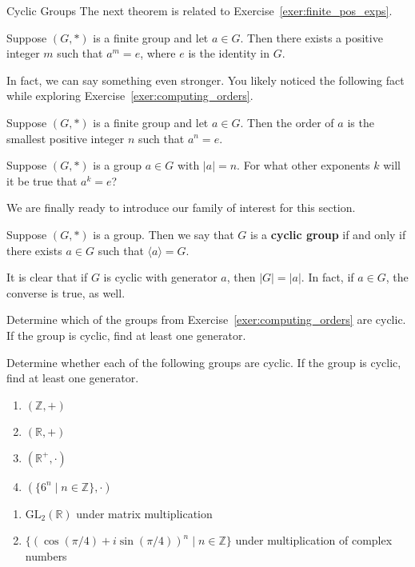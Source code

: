 \begin{section}{Cyclic Groups}
The next theorem is related to Exercise~\ref{exer:finite_pos_exps}.

\begin{theorem}
Suppose $(G,*)$ is a finite group and let $a\in G$.  Then there exists a positive integer $m$ such that $a^m=e$, where $e$ is the identity in $G$. 
\end{theorem}

In fact, we can say something even stronger.  You likely noticed the following fact while exploring Exercise~\ref{exer:computing_orders}.

\begin{theorem}
Suppose $(G,*)$ is a finite group and let $a\in G$.  Then the order of $a$ is the smallest positive integer $n$ such that $a^n=e$.
\end{theorem}

\begin{problem}
Suppose $(G,*)$ is a group $a\in G$ with $|a|=n$.  For what other exponents $k$ will it be true that $a^k=e$?
\end{problem}

We are finally ready to introduce our family of interest for this section.

\begin{definition}
Suppose $(G,*)$ is a group.  Then we say that $G$ is a \textbf{cyclic group} if and only if there exists $a\in G$ such that $\langle a\rangle =G$.
\end{definition}

It is clear that if $G$ is cyclic with generator $a$, then $|G|=|a|$.  In fact, if $a\in G$, the converse is true, as well.

\begin{exercise}
Determine which of the groups from Exercise~\ref{exer:computing_orders} are cyclic.  If the group is cyclic, find at least one generator.
\end{exercise}

\begin{exercise}
Determine whether each of the following groups are cyclic.  If the group is cyclic, find at least one generator.
\begin{multicols}{2}
\begin{enumerate}[label=\rm{(\alph*)}]
\item $(\mathbb{Z},+)$
\item $(\mathbb{R},+)$
\item $(\mathbb{R}^+,\cdot)$
\item $(\{6^n\mid n\in\mathbb{Z}\},\cdot)$
\end{enumerate}
\end{multicols}
\begin{enumerate}
\item $\textrm{GL}_2(\mathbb{R})$ under matrix multiplication
\item $\{(\cos(\pi/4) +i\sin(\pi/4))^n\mid n\in \mathbb{Z}\}$ under multiplication of complex numbers
\end{enumerate}
\end{exercise}


\end{section}
